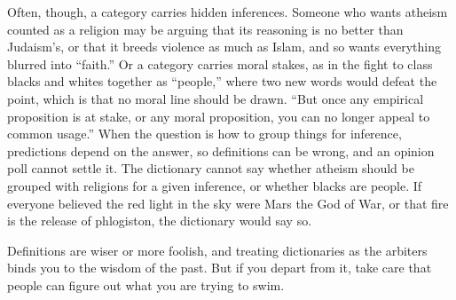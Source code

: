 Often, though, a category carries hidden inferences. Someone who wants atheism counted as a religion may be arguing that its reasoning is no better than Judaism's, or that it breeds violence as much as Islam, and so wants everything blurred into ``faith.'' Or a category carries moral stakes, as in the fight to class blacks and whites together as ``people,'' where two new words would defeat the point, which is that no moral line should be drawn. ``But once any empirical proposition is at stake, or any moral proposition, you can no longer appeal to common usage.''  When the question is how to group things for inference, predictions depend on the answer, so definitions can be wrong, and an opinion poll cannot settle it. The dictionary cannot say whether atheism should be grouped with religions for a given inference, or whether blacks are people. If everyone believed the red light in the sky were Mars the God of War, or that fire is the release of phlogiston, the dictionary would say so.

Definitions are wiser or more foolish, and treating dictionaries as the arbiters binds you to the wisdom of the past. But if you depart from it, take care that people can figure out what you are trying to swim.
